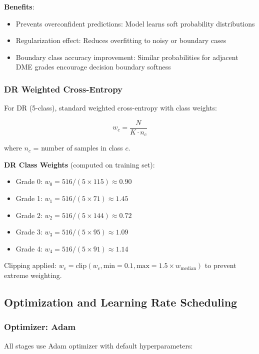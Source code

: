\textbf{Benefits}:
\begin{itemize}
    \item Prevents overconfident predictions: Model learns soft probability distributions
    \item Regularization effect: Reduces overfitting to noisy or boundary cases
    \item Boundary class accuracy improvement: Similar probabilities for adjacent DME grades encourage decision boundary softness
\end{itemize}

\subsubsection{DR Weighted Cross-Entropy}

For DR (5-class), standard weighted cross-entropy with class weights:

\begin{equation}
w_c = \frac{N}{K \cdot n_c}
\end{equation}

where $n_c$ = number of samples in class $c$.

\textbf{DR Class Weights} (computed on training set):
\begin{itemize}
    \item Grade 0: $w_0 = 516 / (5 \times 115) \approx 0.90$
    \item Grade 1: $w_1 = 516 / (5 \times 71) \approx 1.45$
    \item Grade 2: $w_2 = 516 / (5 \times 144) \approx 0.72$
    \item Grade 3: $w_3 = 516 / (5 \times 95) \approx 1.09$
    \item Grade 4: $w_4 = 516 / (5 \times 91) \approx 1.14$
\end{itemize}

Clipping applied: $w_c = \text{clip}(w_c, \text{min}=0.1, \text{max}=1.5 \times w_{\text{median}})$ to prevent extreme weighting.

\subsection{Optimization and Learning Rate Scheduling}

\subsubsection{Optimizer: Adam}

All stages use Adam optimizer with default hyperparameters:

